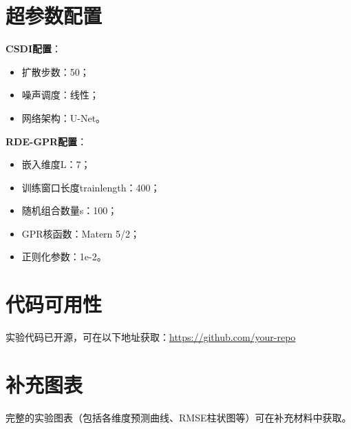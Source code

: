 \documentclass[12pt,a4paper]{article}
\begin{document}
\appendix

\section{超参数配置}

\textbf{CSDI配置}：
\begin{itemize}
    \item 扩散步数：50；
    \item 噪声调度：线性；
    \item 网络架构：U-Net。
\end{itemize}

\textbf{RDE-GPR配置}：
\begin{itemize}
    \item 嵌入维度L：7；
    \item 训练窗口长度trainlength：400；
    \item 随机组合数量s：100；
    \item GPR核函数：Matern 5/2；
    \item 正则化参数：1e-2。
\end{itemize}

\section{代码可用性}

实验代码已开源，可在以下地址获取：\url{https://github.com/your-repo}

\section{补充图表}

完整的实验图表（包括各维度预测曲线、RMSE柱状图等）可在补充材料中获取。
\end{document}
